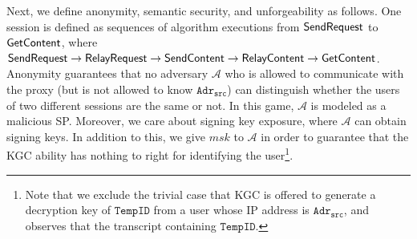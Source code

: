 \documentclass[preprint]{sig-alternate}
\begin{document}
\noindent 
Next, we define anonymity, semantic security, and unforgeability as follows. 
One session is defined as sequences of algorithm executions from ${\sf SendRequest}$ to ${\sf GetContent}$, where ${\sf SendRequest}\rightarrow {\sf RelayRequest} \rightarrow {\sf SendContent} \rightarrow \allowbreak{\sf RelayContent} \rightarrow {\sf GetContent}$. 
Anonymity guarantees that no adversary $\mathcal{A}$ who is allowed to communicate with the proxy (but is not allowed to know $\mathtt{Adr_{src}}$) can distinguish whether the users of two different sessions are the same or not. 
In this game, $\mathcal{A}$ is modeled as a malicious SP. 
Moreover, we care about signing key exposure, where $\mathcal{A}$ can obtain signing keys. In addition to this, we give $msk$ to $\mathcal{A}$ in order to guarantee that the KGC ability has nothing to right for identifying the user\footnote{Note that we exclude the trivial case that KGC is offered to generate a decryption key of $\mathtt{TempID}$ from a user whose IP address is $\mathtt{Adr_{src}}$, and observes that the transcript containing $\mathtt{TempID}$. }. 
\end{document}

